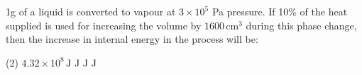 \item 1g of a liquid is converted to vapour at $3 \times 10^5$ Pa pressure. If 10\% of the heat supplied is used for increasing the volume by $1600 \, \text{cm}^3$ during this phase change, then the increase in internal energy in the process will be:
    \begin{tasks}(2)
        \task $4.32 \times 10^8 \, \text{J}$ 
         J
         J
         J
    \end{tasks}